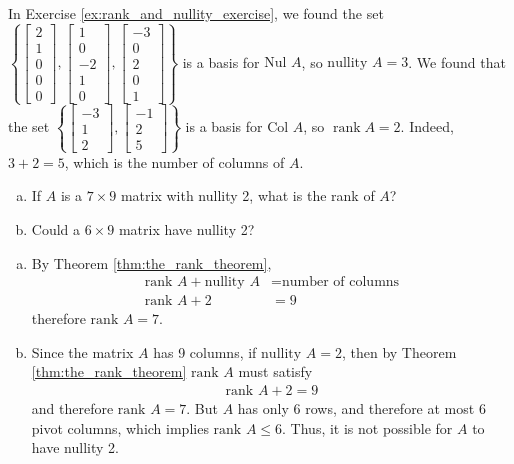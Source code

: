 \documentclass[12pt,letterpaper,reqno]{article}
\numberwithin{equation}{section}
\newcommand{\Nul}{\text{Nul }}
\newcommand{\Col}{\text{Col }}
\DeclareMathOperator{\rank}{rank}
\begin{document}
{\color{red}
\begin{solution}
	In Exercise \ref{ex:rank_and_nullity_exercise}, we found the set $\left\{\begin{bmatrix}
		2 \\ 1 \\ 0 \\ 0 \\ 0
	\end{bmatrix}, \begin{bmatrix}
		1 \\ 0 \\ -2 \\ 1 \\ 0
	\end{bmatrix}, \begin{bmatrix}
		-3 \\ 0 \\ 2 \\ 0 \\1
	\end{bmatrix}\right\}$ is a basis for $\Nul A$, so $\text{nullity }A=3$. We found that the set $\left\{\begin{bmatrix}
			-3 \\ 1 \\ 2
		\end{bmatrix}, \begin{bmatrix}
			-1 \\ 2 \\5 
		\end{bmatrix}\right\}$ is a basis for $\Col A$, so $\rank A=2$. Indeed, $3+2=5$, which is the number of columns of $A$.
\end{solution}}

\begin{exercise}
\begin{enumerate}[(a)]
	\item If $A$ is a $7 \times 9$ matrix with nullity 2, what is the rank of $A$?
	\item Could a $6 \times 9$ matrix have nullity 2?
\end{enumerate}	
\end{exercise}

{\color{red}
\begin{solution}
	\begin{enumerate}[(a)]
		\item By Theorem \ref{thm:the_rank_theorem},
		\begin{align*}
			\text{rank }A+\text{nullity }A&=\text{number of columns} \\
			\text{rank }A+2&=9 
		\end{align*}
		therefore $\text{rank }A=7$.
		\item Since the matrix $A$ has 9 columns, if $\text{nullity }A=2$, then by Theorem \ref{thm:the_rank_theorem} $\text{rank }A$ must satisfy
		\begin{align*}
			\text{rank }A+2=9
		\end{align*}
		and therefore $\text{rank }A=7$. But $A$ has only 6 rows, and therefore at most 6 pivot columns, which implies $\text{rank }A \leq 6$. Thus, it is not possible for $A$ to have nullity 2.
	\end{enumerate}
\end{solution}}
\end{document}
